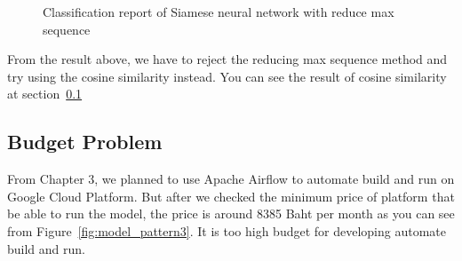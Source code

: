 \documentclass[12pt,oneside,openright,a4paper]{cpe-english-project}
\begin{document}
\begin{figure}[!h]\centering
{}
\caption{Classification report of Siamese neural network with reduce max sequence}
\label{fig:reduce_sequence_result}
\end{figure}

From the result above, we have to reject the reducing max sequence method and
try using the cosine similarity instead. You can see the result of cosine similarity
at section~\ref*{} %

\subsection{Budget Problem}
From Chapter 3, we planned to use Apache Airflow to automate build and run on Google Cloud Platform.
But after we checked the minimum price of platform that be able to run the model,
the price is around 8385 Baht per month as you can see from Figure~\ref*{fig:model_pattern3}.
It is too high budget for developing automate build and run.
\end{document}
